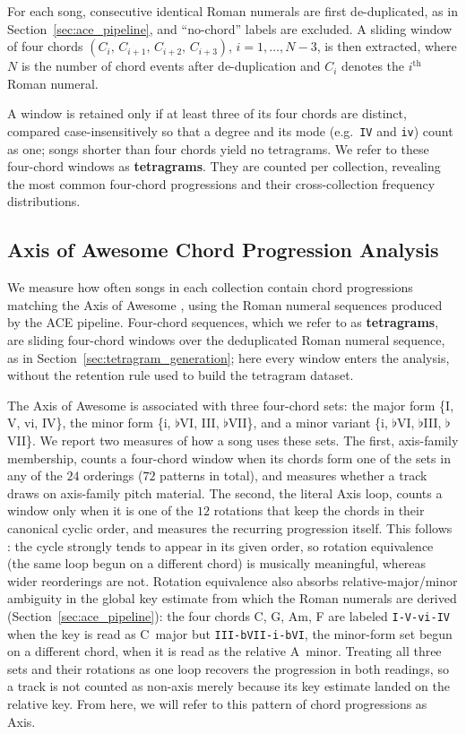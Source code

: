 \documentclass{article}
\newcommand{\rev}[1]{{\color{r2}#1}} %
\begin{document}
For each song, consecutive identical Roman numerals are first de-duplicated, as in Section~\ref{sec:ace_pipeline}, and ``no-chord'' labels are excluded. A sliding window of four chords $(C_{i},\,C_{i+1},\,C_{i+2},\,C_{i+3})$, $i = 1, \ldots, N-3$, is then extracted, where $N$ is the number of chord events after de-duplication and $C_i$ denotes the $i^{\text{th}}$ Roman numeral.

A window is retained only if at least three of its four chords are distinct, compared case-insensitively so that a degree and its mode (e.g.\ \texttt{IV} and \texttt{iv}) count as one; songs shorter than four chords yield no tetragrams. We refer to these four-chord windows as \textbf{tetragrams}. They are counted per collection, revealing the most common four-chord progressions and their cross-collection frequency distributions.

\subsection{Axis of Awesome Chord Progression Analysis}
\label{sec:axis}

We measure how often songs in each collection contain chord progressions matching the Axis of Awesome \citep{richards2017tonal}, using the Roman numeral sequences produced by the ACE pipeline. %
\rev{Four-chord sequences, which we refer to as \textbf{tetragrams}, are sliding four-chord windows over the deduplicated Roman numeral sequence, as in Section~\ref{sec:tetragram_generation}; here every window enters the analysis, without the retention rule used to build the tetragram dataset.}

The Axis of Awesome is associated with three four-chord sets: the major form \{I, V, vi, IV\}, the minor form \{i, $\flat$VI, III, $\flat$VII\}, and a minor variant \{i, $\flat$VI, $\flat$III, $\flat$VII\}. \rev{We report two measures of how a song uses these sets. The first, axis-family membership, counts a four-chord window when its chords form one of the sets in any of the $24$ orderings ($72$ patterns in total), and measures whether a track draws on axis-family pitch material. The second, the literal Axis loop, counts a window only when it is one of the $12$ rotations that keep the chords in their canonical cyclic order, and measures the recurring progression itself. This follows \citet{richards2017tonal}: the cycle strongly tends to appear in its given order, so rotation equivalence (the same loop begun on a different chord) is musically meaningful, whereas wider reorderings are not. Rotation equivalence also absorbs relative-major/minor ambiguity in the global key estimate from which the Roman numerals are derived (Section~\ref{sec:ace_pipeline}): the four chords C, G, Am, F are labeled \texttt{I-V-vi-IV} when the key is read as C~major but \texttt{III-bVII-i-bVI}, the minor-form set begun on a different chord, when it is read as the relative A~minor. Treating all three sets and their rotations as one loop recovers the progression in both readings, so a track is not counted as non-axis merely because its key estimate landed on the relative key.} From here, we will refer to this pattern of chord progressions as Axis.
\end{document}

